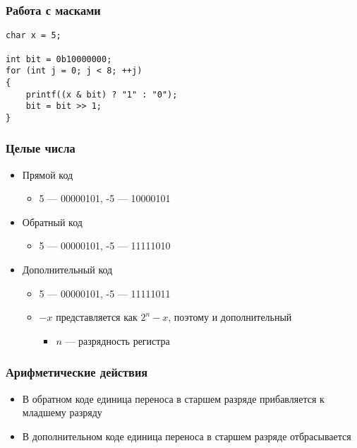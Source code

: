 \documentclass[xetex,mathserif,serif]{beamer}
\begin{document}
	\begin{frame}[fragile]
		\frametitle{Работа с масками}
		\begin{footnotesize}
			\begin{verbatim}
char x = 5;

int bit = 0b10000000;
for (int j = 0; j < 8; ++j)
{
    printf((x & bit) ? "1" : "0");
    bit = bit >> 1;
}
			\end{verbatim}
		\end{footnotesize}
	\end{frame}

	\begin{frame}
		\frametitle{Целые числа}
		\begin{itemize}
			\item Прямой код
			\begin{itemize}
				\item 5 --- 00000101, -5 --- 10000101
			\end{itemize}
			\item Обратный код
			\begin{itemize}
				\item 5 --- 00000101, -5 --- 11111010
			\end{itemize}
			\item Дополнительный код
			\begin{itemize}
				\item 5 --- 00000101, -5 --- 11111011
				\item $-x$ представляется как $2^n - x$, поэтому и дополнительный
				\begin{itemize}
					\item $n$ --- разрядность регистра
				\end{itemize} 
			\end{itemize}
		\end{itemize}
	\end{frame}

	\begin{frame}
		\frametitle{Арифметические действия}
		\begin{itemize}
			\item В обратном коде единица переноса в старшем разряде прибавляется к младшему разряду
			\item В дополнительном коде единица переноса в старшем разряде отбрасывается
		\end{itemize}
	\end{frame}
\end{document}
